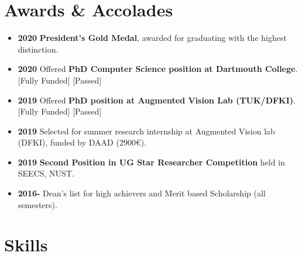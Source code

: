 \documentclass[11pt,a4paper,sans]{moderncv}        %
\newcommand{\ExternalLink}{%
    \tikz[x=1.2ex, y=1.2ex, baseline=-0.05ex]{%
        \begin{scope}[x=1ex, y=1ex]
            \clip (-0.1,-0.1) 
                --++ (-0, 1.2) 
                --++ (0.6, 0) 
                --++ (0, -0.6) 
                --++ (0.6, 0) 
                --++ (0, -1);
            \path[draw, 
                line width = 0.5, 
                rounded corners=0.5] 
                (0,0) rectangle (1,1);
        \end{scope}
        \path[draw, line width = 0.5] (0.5, 0.5) 
            -- (1, 1);
        \path[draw, line width = 0.5] (0.6, 1) 
            -- (1, 1) -- (1, 0.6);
        }
    }
\begin{document}
\begin{itemize}


\end{itemize}

\section{Awards \& Accolades}

\begin{itemize}
    \setlength\itemsep{0em}
    \item[] \textbf{2020  } \textbf{President’s Gold Medal}, awarded for graduating with the highest distinction.
    \item[] \textbf{2020 } Offered \textbf{PhD Computer Science position at Dartmouth College}. [Fully Funded] [Passed]
    \item[] \textbf{2019 } Offered \textbf{PhD position at Augmented Vision Lab (TUK/DFKI)}. [Fully Funded] [Passed]
    \item[] \textbf{2019  } Selected for summer research internship at Augmented Vision lab (DFKI), funded by DAAD (2900€).
    \item[] \textbf{2019  } \textbf{Second Position in UG Star Researcher Competition} held in SEECS, NUST.
    \item[] \textbf{2016- }Dean’s list for high achievers and  Merit based Scholarship (all semesters).
\end{itemize}

\section{Skills}
\vspace{3pt}
\end{document}
